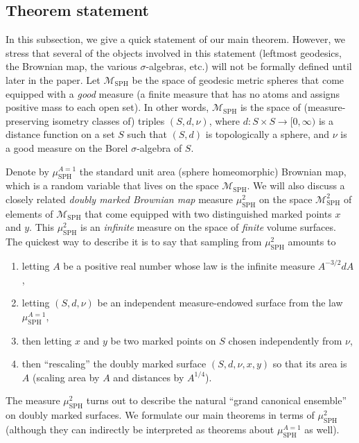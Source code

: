 \documentclass[JEP,XML,SOM,Unicode]{cedram}
\let\mathcal\mathscr
\theoremstyle{plain}
\numberwithin{theorem}{section}
\theoremstyle{definition}
\newcommand\gmsspace{{\mathcal M}_{\mathrm{SPH}}}
\newcommand{\mustwo}{\mu_{\mathrm{SPH}}^2}
\newcommand{\musa}{{\mu_{\mathrm{SPH}}^{A=1}}}
\begin{document}
\pagebreak[2]
\subsection{Theorem statement}
\label{subsec::theoremstatement}

In this subsection, we give a quick statement of our main theorem. However, we stress that several of the objects involved in this statement (leftmost geodesics, the Brownian map, the various $\sigma$-algebras, etc.) will not be formally defined until later in the paper. Let $\gmsspace$ be the space of geodesic metric spheres that come equipped with a \emph{good} measure (\ie a finite measure that has no atoms and assigns positive mass to each open set). In other words, $\gmsspace$ is the space of (measure-preserving isometry classes of) triples $(S, d, \nu)$, where $d \colon S\times S \to [0,\infty)$ is a distance function on a set $S$ such that $(S,d)$ is topologically a sphere, and $\nu$ is a good measure on the Borel $\sigma$-algebra of $S$.

Denote by $\musa$ the standard unit area (sphere homeomorphic) Brownian map, which is a random variable that lives on the space $\gmsspace$. We will also discuss a closely related \emph{doubly marked Brownian map} measure $\mustwo$ on the space $\gmsspace^2$ of elements of $\gmsspace$ that come equipped with two distinguished marked points $x$ and $y$. This $\mustwo$ is an \emph{infinite} measure on the space of \emph{finite} volume surfaces. The quickest way to describe it is to say that sampling from $\mustwo$ amounts to\begin{enumerate}
\item letting $A$ be a positive real number whose law is the infinite measure $A^{-3/2}dA$,
\item letting $(S, d, \nu)$ be an independent measure-endowed surface from the law $\musa$,
\item then letting $x$ and $y$ be two marked points on $S$ chosen independently from $\nu$,
\item then ``rescaling'' the doubly marked surface $(S, d, \nu, x, y)$ so that its area is $A$ (scaling area by $A$ and distances by $A^{1/4}$).
\end{enumerate} The measure $\mustwo$ turns out to describe the natural ``grand canonical ensemble'' on doubly marked surfaces. We formulate our main theorems in terms of $\mustwo$ (although they can indirectly be interpreted as theorems about $\musa$ as well).
\end{document}
